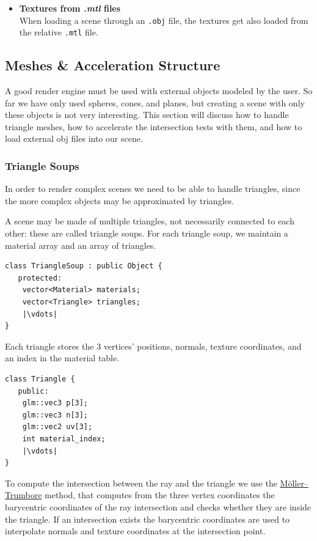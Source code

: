 \documentclass[tikz,14pt,fleqn]{article}
\begin{document}
\begin{itemize}
    \item{\textbf{Textures from \textit{.mtl} files}}\\
    When loading a scene through an \verb|.obj| file, the textures get also loaded from the relative \verb|.mtl| file.
\end{itemize}

\subsection{Meshes \& Acceleration Structure}
A good render engine must be used with external objects modeled by the user. So far we have only used spheres, cones, and planes, but creating a scene with only these objects is not very interesting.
This section will discuss how to handle triangle meshes, how to accelerate the intersection tests with them, and how to load external obj files into our scene.

\subsubsection{Triangle Soups}

In order to render complex scenes we need to be able to handle triangles, since the more complex objects may be approximated by triangles.





A scene may be made of multiple triangles, not necessarily connected to each other: these are called triangle soups.
For each triangle soup, we maintain a material array and an array of triangles. 

\begin{verbatim}
class TriangleSoup : public Object {
   protected:
    vector<Material> materials;
    vector<Triangle> triangles;
    |\vdots|
}
\end{verbatim}

Each triangle stores the 3 vertices' positions, normals, texture coordinates, and an index in the material table.   

\begin{verbatim}
class Triangle {
   public:
    glm::vec3 p[3];
    glm::vec3 n[3];
    glm::vec2 uv[3];
    int material_index;
    |\vdots|
}
\end{verbatim}

To compute the intersection between the ray and the triangle we use the \href{https://en.wikipedia.org/wiki/M%C3%B6ller%E2%80%93Trumbore_intersection_algorithm}{Möller–Trumbore} method, 
that computes from the three vertex coordinates the barycentric coordinates of the ray intersection and checks whether they are inside the triangle. If an intersection exists the barycentric coordinates are used to interpolate normals and texture coordinates at the intersection point.
\end{document}
